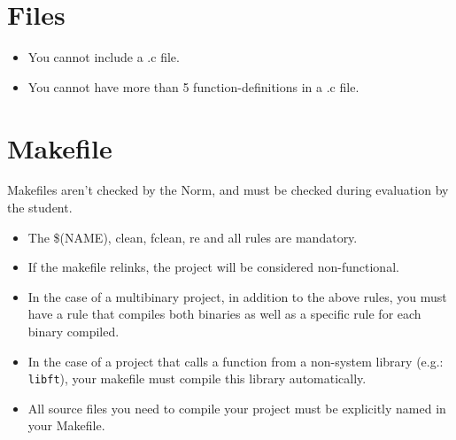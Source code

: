 \documentclass{42-ru}
\begin{document}
    \section{Files}

        \begin{itemize}

            \item You cannot include a .c file.

            \item You cannot have more than 5 function-definitions in a .c file.

        \end{itemize}
        \newpage


    \section{Makefile}

            Makefiles aren't checked by the Norm, and must be checked during evaluation by 
            the student.
            \begin{itemize}

                \item The \$(NAME), clean, fclean, re and all
                  rules are mandatory.

                \item If the makefile relinks, the project will be considered
                  non-functional.

                \item In the case of a multibinary project, in addition to
                  the above rules, you must have a rule that compiles
                  both binaries as well as a specific rule for each
                  binary compiled.

                  \item In the case of a project that calls a function from a non-system library
                  (e.g.: \texttt{libft}), your makefile must compile
                  this library automatically.

                  \item All source files you need to compile your project must
                    be explicitly named in your Makefile.

            \end{itemize}
\end{document}
